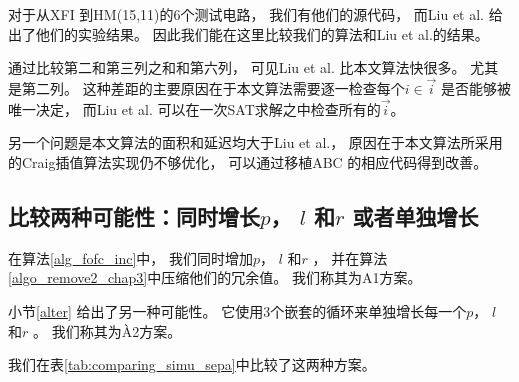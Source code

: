 
对于从XFI 到HM(15,11)的6个测试电路，
我们有他们的源代码，
而Liu et al. 给出了他们的实验结果。
因此我们能在这里比较我们的算法和Liu et al.的结果。

通过比较第二和第三列之和和第六列，
可见Liu et al. 比本文算法快很多。
尤其是第二列。
这种差距的主要原因在于本文算法需要逐一检查每个$i\in \vec{i}$ 是否能够被唯一决定，
而Liu et al. 可以在一次SAT求解之中检查所有的$\vec{i}$。

另一个问题是本文算法的面积和延迟均大于Liu et al.，
原因在于本文算法所采用的Craig插值算法实现仍不够优化，
可以通过移植ABC 的相应代码得到改善。




\subsection{比较两种可能性：同时增长$p$， $l$ 和$r$ 或者单独增长}\label{subsec_incr_plr_exp}

在算法\ref{alg_fofc_inc}中，
我们同时增加$p$， $l$ 和$r$ ，
并在算法\ref{algo_remove2_chap3}中压缩他们的冗余值。
我们称其为A1方案。

小节\ref{alter} 给出了另一种可能性。
它使用3个嵌套的循环来单独增长每一个$p$， $l$ 和$r$ 。
我们称其为À2方案。

我们在表\ref{tab:comparing_simu_sepa}中比较了这两种方案。

